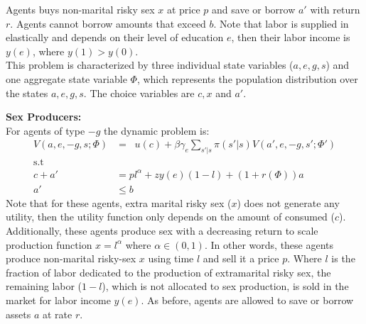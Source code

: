  Agents buys non-marital risky sex $x$ at price $p$ and save or borrow $a'$ with return $r$. Agents cannot borrow amounts that exceed $b$. Note that labor is supplied in elastically and depends on their level of education $e$, then their labor income is $y(e)$, where $y(1)>y(0)$.\\
 This problem is characterized by three individual state variables ($a,e,g,s$) and one aggregate state variable $\Phi$, which represents the population distribution over the states $a,e,g,s$. The choice variables are $c,x$ and $a'$.\\

\noindent \textbf{Sex Producers:}\\
For agents of type $-g$ the dynamic problem is:
\begin{align}
V(a,e,-g,s;\Phi) &= \mathop{\max_{c\geq 0, 1\geq l\geq 0,a' \geq 0}}  u(c) + \beta \gamma_{e} \sum_{s'|s}\pi(s'|s)V(a',e,-g,s';\Phi') \label{eq3}\\
\mbox{s.t}\nonumber\\
c +a'&= pl^{\alpha}+zy(e)(1-l) + (1+r(\Phi))a \label{eq4}\\
a' &\leq b
\end{align}
Note that for these agents, extra marital risky sex ($x$) does not generate any utility, then the utility function only depends on the amount of consumed ($c$). Additionally, these agents produce sex with a decreasing return to scale production function $x=l^{\alpha}$ where $\alpha\in(0,1)$. In other words, these agents produce non-marital risky-sex $x$ using time $l$ and sell it a price $p$. Where $l$ is the fraction of labor dedicated to the production of extramarital risky sex, the remaining labor ($1-l$), which is not allocated to sex production, is sold in the market for labor income $y(e)$. As before, agents are allowed to save or borrow assets $a$ at rate $r$.\\

